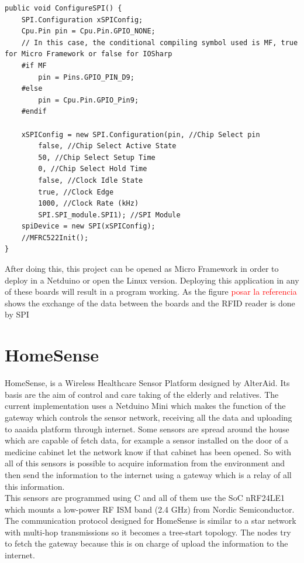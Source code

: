 \begin{lstlisting}[language=CSharp, caption={SPIApi.cs - Conditional compiling symbol for NETMF and IOSharp}]
public void ConfigureSPI() {
    SPI.Configuration xSPIConfig;
    Cpu.Pin pin = Cpu.Pin.GPIO_NONE;
  	// In this case, the conditional compiling symbol used is MF, true for Micro Framework or false for IOSharp
  	#if MF
    	pin = Pins.GPIO_PIN_D9;
    #else
        pin = Cpu.Pin.GPIO_Pin9;
    #endif

    xSPIConfig = new SPI.Configuration(pin, //Chip Select pin
        false, //Chip Select Active State
        50, //Chip Select Setup Time
        0, //Chip Select Hold Time
        false, //Clock Idle State
        true, //Clock Edge
        1000, //Clock Rate (kHz)
        SPI.SPI_module.SPI1); //SPI Module
    spiDevice = new SPI(xSPIConfig);
    //MFRC522Init();
}
\end{lstlisting}

After doing this, this project can be opened as Micro Framework in order to deploy in a Netduino or open the Linux version. Deploying this application in any of these boards will result in a program working. As the figure \textcolor{red}{posar la referencia} shows the exchange of the data between the boards and the RFID reader is done by SPI

\section{HomeSense}\label{S:IOEx-HomeSense}
HomeSense, is a Wireless Healthcare Sensor Platform designed by AlterAid. Its basis are the aim of control and care taking of the elderly and relatives. The current implementation uses a Netduino Mini which makes the function of the gateway which controls the sensor network, receiving all the data and uploading to aaaida platform through internet.
Some sensors are spread around the house which are capable of fetch     data, for example a sensor installed on the door of a medicine cabinet let the network know if that cabinet has been opened. So with all of this sensors is possible to acquire information from the environment and then send the information to the internet using a gateway which is a relay of all this information.
\\
This sensors are programmed using C and all of them use the \gls{SoC} nRF24LE1 which mounts a low-power RF ISM band (2.4 GHz) from Nordic Semiconductor.
\\
The communication protocol designed for HomeSense is similar to a star network with multi-hop transmissions so it becomes a tree-start topology. The nodes try to fetch the gateway because this is on charge of upload the information to the internet.


